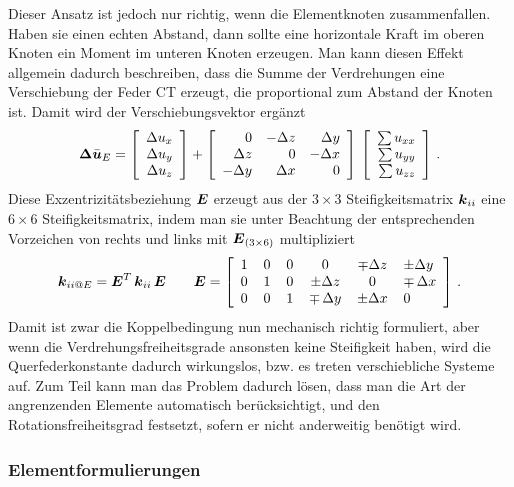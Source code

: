 Dieser Ansatz ist jedoch nur richtig, wenn die Elementknoten zusammenfallen. Haben sie einen echten Abstand, dann sollte eine horizontale Kraft im oberen Knoten ein Moment im unteren Knoten erzeugen. Man kann diesen Effekt allgemein dadurch beschreiben, dass die Summe der Verdrehungen eine Verschiebung der Feder CT erzeugt, die proportional zum Abstand der Knoten ist. Damit wird der Verschiebungsvektor erg\"{a}nzt
\begin{align}
\vek \Delta \bar{\vek u}_E = \left[\barr{r } \Delta u_x \\ \Delta u_y \\ \Delta u_z\earr\right] +
\left[\barr{r r r} 0 & - \Delta z & \Delta y\\  \Delta z & 0 & -\Delta x\\
-\Delta y &\Delta x &0 \earr\right] \,\left[\barr{r } \sum u_{xx} \\ \sum u_{yy} \\ \sum u_{zz} \earr\right]\,.
\end{align}
Diese Exzentrizit\"{a}tsbeziehung $\vek E$ erzeugt aus der $3 \times 3$ Steifigkeitsmatrix $\vek k_{ii}$ eine $6 \times 6$ Steifigkeitsmatrix, indem man sie unter Beachtung der entsprechenden Vorzeichen von rechts und links mit $\vek E_{(3 \times 6)}$ multipliziert
\begin{align}
\vek k_{ii @E} = \vek E^T\,\vek k_{ii}\,\vek E \qquad \vek E = \left[\barr{c@{\hspace{4mm}} c @{\hspace{4mm}}c@{\hspace{4mm}} c @{\hspace{4mm}}c @{\hspace{4mm}}l } 1 &0 &0 &0 & \mp \Delta z &\pm \Delta y\\
0 & 1 &0 & \pm \Delta z & 0 & \mp\,\Delta x\\
0& 0 &1 &\mp\,\Delta y &\pm \Delta x &0 \earr\right]\,.
\end{align}
Damit ist zwar die Koppelbedingung nun mechanisch richtig formuliert, aber wenn die Verdrehungsfreiheitsgrade ansonsten keine Steifigkeit haben, wird die Querfederkonstante dadurch wirkungslos, bzw. es treten verschiebliche Systeme auf. Zum Teil kann man das Problem dadurch l\"{o}sen, dass man die Art der angrenzenden Elemente automatisch ber\"{u}cksichtigt, und den Rotationsfreiheitsgrad festsetzt, sofern er nicht anderweitig ben\"{o}tigt wird.

{\textcolor{sectionTitleBlue}{\subsubsection*{Elementformulierungen}}}

